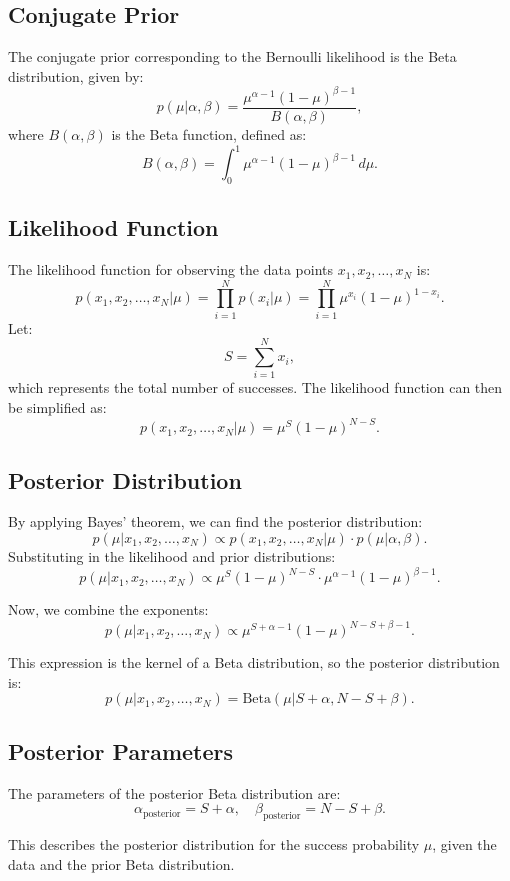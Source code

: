 \documentclass[12pt]{article}
\begin{document}
\subsection*{Conjugate Prior}
The conjugate prior corresponding to the Bernoulli likelihood is the Beta distribution, given by:
\[
p(\mu | \alpha, \beta) = \frac{\mu^{\alpha - 1} (1 - \mu)^{\beta - 1}}{B(\alpha, \beta)},
\]
where \(B(\alpha, \beta)\) is the Beta function, defined as:
\[
B(\alpha, \beta) = \int_0^1 \mu^{\alpha - 1} (1 - \mu)^{\beta - 1} \, d\mu.
\]

\subsection*{Likelihood Function}
The likelihood function for observing the data points \(x_1, x_2, \dots, x_N\) is:
\[
p(x_1, x_2, \dots, x_N | \mu) = \prod_{i=1}^N p(x_i | \mu) = \prod_{i=1}^N \mu^{x_i} (1 - \mu)^{1-x_i}.
\]
Let:
\[
S = \sum_{i=1}^N x_i,
\]
which represents the total number of successes. The likelihood function can then be simplified as:
\[
p(x_1, x_2, \dots, x_N | \mu) = \mu^S (1 - \mu)^{N-S}.
\]

\subsection*{Posterior Distribution}
By applying Bayes' theorem, we can find the posterior distribution:
\[
p(\mu | x_1, x_2, \dots, x_N) \propto p(x_1, x_2, \dots, x_N | \mu) \cdot p(\mu | \alpha, \beta).
\]
Substituting in the likelihood and prior distributions:
\[
p(\mu | x_1, x_2, \dots, x_N) \propto \mu^S (1 - \mu)^{N-S} \cdot \mu^{\alpha-1} (1 - \mu)^{\beta-1}.
\]

Now, we combine the exponents:
\[
p(\mu | x_1, x_2, \dots, x_N) \propto \mu^{S + \alpha - 1} (1 - \mu)^{N - S + \beta - 1}.
\]

This expression is the kernel of a Beta distribution, so the posterior distribution is:
\[
p(\mu | x_1, x_2, \dots, x_N) = \text{Beta}(\mu | S + \alpha, N - S + \beta).
\]

\subsection*{Posterior Parameters}
The parameters of the posterior Beta distribution are:
\[
\alpha_{\text{posterior}} = S + \alpha, \quad \beta_{\text{posterior}} = N - S + \beta.
\]

This describes the posterior distribution for the success probability \( \mu \), given the data and the prior Beta distribution.
\end{document}
